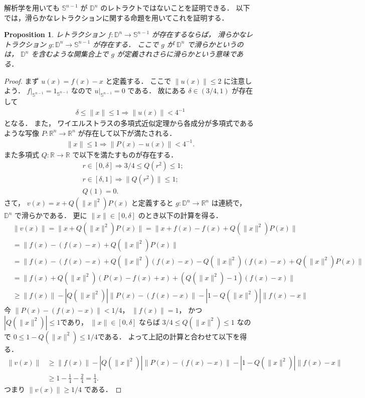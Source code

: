 \documentclass[leqno, a4paper, 12pt]{jsarticle}
\theoremstyle{plain}
\newtheorem{prop}[thm]{Proposition}
\theoremstyle{definition}
\theoremstyle{remark}
\newcommand{\To}{\Longrightarrow}
\newcommand{\rr}{\mathbb{R}}
\newcommand{\yospfont}[1]{\mathbb{#1}}
\newcommand{\yodisc}[1]{\yospfont{D}^{#1}}
\newcommand{\yosphere}[1]{\yospfont{S}^{#1}}
\newcommand{\yoidmap}[1]{1_{#1}}
\numberwithin{equation}{section}
\begin{document}
解析学を用いても
$\yosphere{n-1}$
が
$\yodisc{n}$
のレトラクトではないことを証明できる．
以下では，滑らかなレトラクションに関する命題を用いてこれを証明する．
\begin{prop}
レトラクション
$f\colon \yodisc{n}\to \yosphere{n-1}$
が存在するならば，
滑らかなレトラクション
$g\colon \yodisc{n}\to \yosphere{n-1}$
が存在する．
ここで
$g$
が
$\yodisc{n}$
で滑らかというのは，
$\yodisc{n}$
を含むような開集合上で
$g$
が定義されさらに滑らかという意味である．
\end{prop}
\begin{proof}
まず
$u(x)=f(x)-x$
と定義する．
ここで
$\|u(x)\|\le 2$
に注意しよう．
$f|_{\yosphere{n-1}}=\yoidmap{\yosphere{n-1}}$
なので
$u|_{\yosphere{n-1}}=0$
である．
故にある
$\delta\in(3/4,1)$
が存在して
\begin{align}
\delta\le \|x\|\le 1\To \|u(x)\|<4^{-1}
\end{align}
となる．
また，
ワイエルストラスの多項式近似定理から各成分が多項式であるような写像
$P\colon \rr^{n}\to \rr^{n}$
が存在して以下が満たされる．
\begin{align}
\|x\|\le 1\To \|P(x)-u(x)\|<4^{-1}. 
\end{align}
また多項式
$Q\colon \rr\to \rr$
で以下を満たすものが存在する．
\begin{align}
&r\in [0,\delta]\To 3/4\le Q(r^2)\le 1;\\
&r\in [\delta, 1]\To \|Q(r^2)\|\le 1;\\
&Q(1)=0. 
\end{align}
さて，
$v(x)=x+Q(\|x\|^2)P(x)$
と定義すると
$g\colon \yodisc{n}\to \rr^n$
は連続で，
$\yodisc{n}$
で滑らかである．
更に
$\|x\|\in[0,\delta]$
のとき以下の計算を得る．
\begin{align*}
&\|v(x)\|=\|x+Q(\|x\|^2)P(x)\|=\|x+f(x)-f(x)+Q(\|x\|^2)P(x)\|
\\
&=\|f(x)-(f(x)-x)+Q(\|x\|^2)P(x)\|\\
&=\|f(x)-(f(x)-x)+Q(\|x\|^2)(f(x)-x)-Q(\|x\|^2)(f(x)-x)+Q(\|x\|^2)P(x)\|\\
&=\|f(x)+Q(\|x\|^2)(P(x)-f(x)+x)+(Q(\|x\|^2)-1)(f(x)-x)\|\\
&\ge
\|f(x)\|-|Q(\|x\|^2)|\|P(x)-(f(x)-x)\|-|1-Q(\|x\|^2)|\|f(x)-x\|
\end{align*}
今
$\|P(x)-(f(x)-x)\|<1/4$，
$\|f(x)\|=1$，
かつ
$|Q(\|x\|^2)|\le 1$であり，
$\|x\|\in[0,\delta]$
ならば
$3/4\le Q(\|x\|^2)\le 1$
なので
$0\le 1-Q(\|x\|^2)\le 1/4$である．
よって上記の計算と合わせて以下を得る．
\begin{align*}
\|v(x)\|&\ge \|f(x)\|-|Q(\|x\|^2)|\|P(x)-(f(x)-x)\|-|1-Q(\|x\|^2)|\|f(x)-x\|\\
&\ge1-\frac{1}{4}-\frac{2}{4}=\frac{1}{4}. 
\end{align*}
つまり
$\|v(x)\|\ge 1/4$
である．


\end{proof}
\end{document}
